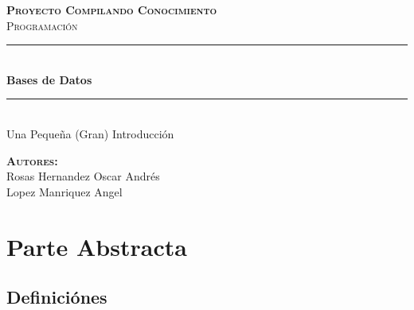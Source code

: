 \documentclass[12pt, fleqn]{report}                             %
\author{Oscar Andrés Rosas}                                     %
\begin{document}
\begin{titlepage}

	\center
	\textbf{\textsc{\Large Proyecto Compilando Conocimiento}}\\[1.0cm] 
	\textsc{\Large Programación}\\[1.0cm] 

	\rule{\linewidth}{0.5mm} \\[1.0cm]
		{ \huge \bfseries Bases de Datos}\\[1.0cm] 
	\rule{\linewidth}{0.5mm} \\[2.0cm]
	
	{\LARGE Una Pequeña (Gran) Introducción}\\[7cm] 
	
	\begin{center} \large
    \textbf{\textsc{Autores:}}\\
        Rosas Hernandez Oscar Andrés \\
        Lopez Manriquez Angel
    \end{center}

	\vfill

\end{titlepage}

\tableofcontents{}
\label{sec:Index}

\clearpage




\part{Parte Abstracta}
\clearpage


    \chapter{Definiciónes}
\end{document}
